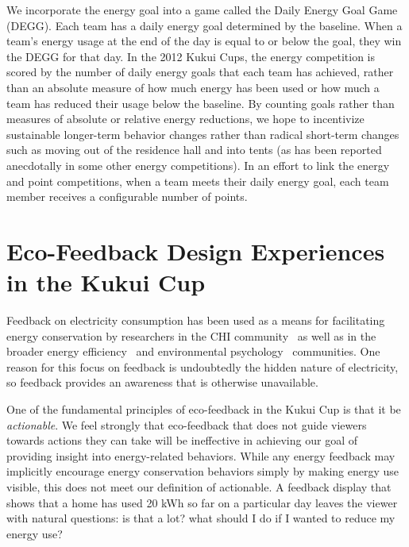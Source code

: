 \documentclass{sigchi}
\begin{document}
We incorporate the energy goal into a game called the Daily Energy Goal Game (DEGG). Each team has a daily energy goal determined by the baseline. When a team's energy usage at the end of the day is equal to or below the goal, they win the DEGG for that day. In the 2012 Kukui Cups, the energy competition is scored by the number of daily energy goals that each team has achieved, rather than an absolute measure of how much energy has been used or how much a team has reduced their usage below the baseline. By counting goals rather than measures of absolute or relative energy reductions, we hope to incentivize sustainable longer-term behavior changes rather than radical short-term changes such as moving out of the residence hall and into tents (as has been reported anecdotally in some other energy competitions). In an effort to link the energy and point competitions, when a team meets their daily energy goal, each team member receives a configurable number of points.


\section{Eco-Feedback Design Experiences in the Kukui Cup}

Feedback on electricity consumption has been used as a means for facilitating energy conservation by researchers in the CHI community~\cite{Froehlich2010} as well as in the broader energy efficiency~\cite{darby-review-2006, Faruqui09, Foster-2012} and environmental psychology~\cite{Becker78, Houwelingen89} communities. One reason for this focus on feedback is undoubtedly the hidden nature of electricity, so feedback provides an awareness that is otherwise unavailable.

One of the fundamental principles of eco-feedback in the Kukui Cup is that it be \emph{actionable}. We feel strongly that eco-feedback that does not guide viewers towards actions they can take will be ineffective in achieving our goal of providing insight into energy-related behaviors. While any energy feedback may implicitly encourage energy conservation behaviors simply by making energy use visible, this does not meet our definition of actionable. A feedback display that shows that a home has used 20 kWh so far on a particular day leaves the viewer with natural questions: is that a lot? what should I do if I wanted to reduce my energy use?
\end{document}
